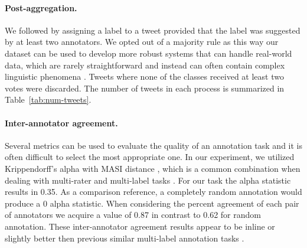 \paragraph{Post-aggregation.} 
We followed  by assigning a label to a tweet provided that the label was suggested by at least two annotators. %
We opted out of a majority rule as this way our dataset can be used to develop more robust systems that can handle real-world data, which are rarely straightforward and instead can often contain complex linguistic phenomena \cite{mohammad2018semeval}. Tweets where none of the classes received at least two votes were discarded.
The number of tweets in each process is summarized in Table~\ref{tab:num-tweets}.

\begin{table}[t]
\centering
{}
\caption{Number of total tweets after each step.}
\label{tab:num-tweets}
\end{table}

\paragraph{Inter-annotator agreement.}
Several metrics can be used to evaluate the quality of an annotation task \cite{artstein2008inter} and it is often difficult to select the most appropriate one. In our experiment, 
we utilized Krippendorff's alpha \cite{krippendorff2011computing} with MASI distance \cite{passonneau2006measuring}, which is a common combination when dealing with multi-rater and multi-label tasks \cite{artstein2008inter}. For our task the alpha statistic results in 0.35. As a comparison reference, a completely random annotation would produce a 0 alpha statistic. 
When considering the percent agreement of each pair of annotators we acquire a value of 0.87 in contrast to 0.62 for random annotation. 
These inter-annotator agreement results appear to be inline or slightly better then previous similar multi-label annotation tasks \cite{mohammad2018semeval}.


